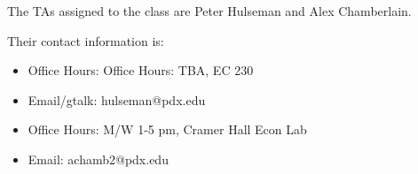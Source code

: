 The TAs assigned to the class are Peter Hulseman and Alex Chamberlain. 

Their contact information is:
\begin{itemize}
 \item Office Hours: Office Hours: TBA, EC 230
 \item Email/gtalk: hulseman@pdx.edu
\end{itemize}

\begin{itemize}
 \item Office Hours: M/W 1-5 pm, Cramer Hall Econ Lab
 \item Email: achamb2@pdx.edu
\end{itemize}
